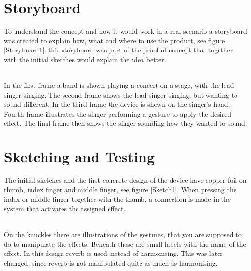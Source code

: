 \section{Storyboard}

To understand the concept and how it would work in a real scenario a storyboard was created to explain how, what and where to use the product, see figure \ref{Storyboard1}. this storyboard was part of the proof of concept that together with the initial sketches would explain the idea better.\\

\begin{minipage}{\linewidth}%
\label{Storyboard1}
\end{minipage}\\

In the first frame a band is shown playing a concert on a stage, with the lead singer singing. The second frame shows the lead singer singing, but wanting to sound different. In the third frame the device is shown on the singer's hand. Fourth frame illustrates the singer performing a gesture to apply the desired effect. The final frame then shows the singer sounding how they wanted to sound.

\section{Sketching and Testing}

The initial sketches and the first concrete design of the device have copper foil on thumb, index finger and middle finger, see figure \ref{Sketch1}. When pressing the index or middle finger together with the thumb, a connection is made in the system that activates the assigned effect. \\

\begin{minipage}{\linewidth}%
\label{Sketch1}
\end{minipage}\\

On the knuckles there are illustrations of the gestures, that you are supposed to do to manipulate the effects. Beneath those are small labels with the name of the effect. In this design reverb is used instead of harmonising. This was later changed, since reverb is not manipulated quite as much as harmonising.

